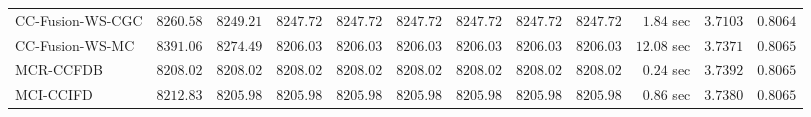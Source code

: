 \begin{table}[H]
\begin{tabular}{lrrrrrrrrrrr}
    CC-Fusion-WS-CGC & $      8260.58$ & $      8249.21$ & $      8247.72$ & $      8247.72$ & $      8247.72$ & $      8247.72$ & $      8247.72$ & $      8247.72$ & $         1.84$ sec    & $       3.7103$  & $       0.8064$ \\ 
     CC-Fusion-WS-MC & $      8391.06$ & $      8274.49$ & $      8206.03$ & $      8206.03$ & $      8206.03$ & $      8206.03$ & $      8206.03$ & $      8206.03$ & $        12.08$ sec    & $       3.7371$  & $       0.8065$ \\ 
\cmidrule{1-1} 
           MCR-CCFDB & $      8208.02$ & $      8208.02$ & $      8208.02$ & $      8208.02$ & $      8208.02$ & $      8208.02$ & $      8208.02$ & $      8208.02$ & $         0.24$ sec    & $       3.7392$  & $       0.8065$ \\ 
\cmidrule{1-1} 
           MCI-CCIFD & $      8212.83$ & $      8205.98$ & $      8205.98$ & $      8205.98$ & $      8205.98$ & $      8205.98$ & $      8205.98$ & $      8205.98$ & $         0.86$ sec    & $       3.7380$  & $       0.8065$ \\ 
\bottomrule
\end{tabular}
\end{table}

